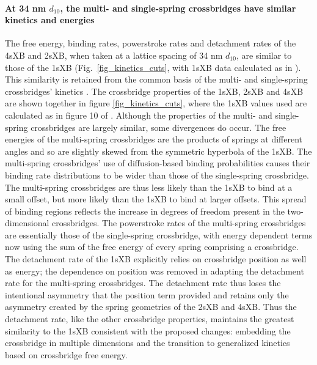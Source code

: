 \documentclass[]{article}
\begin{document}
\paragraph{At 34 nm $d_{10}$, the multi- and single-spring crossbridges have similar kinetics and energies} %
The free energy, binding rates, powerstroke rates and detachment rates of the 4sXB and 2sXB, when taken at a lattice spacing of 34 nm $d_{10}$, are similar to those of the 1sXB (Fig.~\ref{fig_kinetics_cuts}, with 1sXB data calculated as in \citet{Tanner2007}). 
This similarity is retained from the common basis of the multi- and single-spring crossbridges' kinetics \citep{Pate1989}.
The crossbridge properties of the 1sXB, 2sXB and 4sXB are shown together in figure \ref{fig_kinetics_cuts}, where the 1sXB values used are calculated as in figure 10 of \citet{Tanner2007}. 
Although the properties of the multi- and single-spring crossbridges are largely similar, some divergences do occur. 
The free energies of the multi-spring crossbridges are the products of springs at different angles and so are slightly skewed from the symmetric hyperbola of the 1sXB.
The multi-spring crossbridges' use of diffusion-based binding probabilities  causes their binding rate distributions to be wider than those of the single-spring crossbridge.
The multi-spring crossbridges are thus less likely than the 1sXB to bind at a small offset, but more likely than the 1sXB to bind at larger offsets. 
This spread of binding regions reflects the increase in degrees of freedom present in the two-dimensional crossbridges. 
The powerstroke rates of the multi-spring crossbridges are essentially those of the single-spring crossbridge, with energy dependent terms now using the  sum of the free energy of every spring comprising a crossbridge. 
The detachment rate of the 1sXB explicitly relies on crossbridge position as well as energy; the dependence on position was removed in adapting the detachment rate for the multi-spring crossbridges. 
The detachment rate thus loses the intentional asymmetry that the position term provided and retains only the asymmetry created by the spring geometries of the 2sXB and 4sXB. 
Thus the detachment rate, like the other crossbridge properties, maintains the greatest similarity to the 1sXB consistent with the proposed changes: embedding the crossbridge in multiple dimensions and the transition to generalized kinetics based on crossbridge free energy. 
\end{document}
